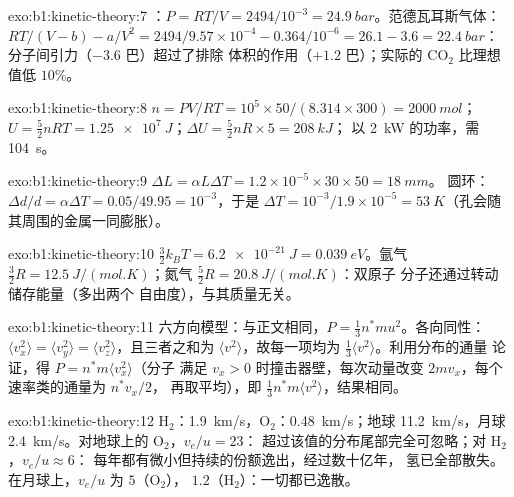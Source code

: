 \begin{solution}{exo:b1:kinetic-theory:7}
：$P = RT/V = 2494/10^{-3} = \qty{24.9}{bar}$。范德瓦耳斯气体：
$RT/(V - b) - a/V^2 = 2494/9.57\times10^{-4} - 0.364/10^{-6} = 26.1 - 3.6 =
\qty{22.4}{bar}$：分子间引力（$-3.6$ 巴）超过了排除
体积的作用（$+1.2$ 巴）；实际的 CO$_2$ 比理想值低 $10\%$。
\end{solution}

\begin{solution}{exo:b1:kinetic-theory:8}
$n = PV/RT = 10^5 \times 50/(8.314 \times 300) = \qty{2000}{mol}$；$U = \tfrac52
nRT = \qty{1.25e7}{J}$；$\Delta U = \tfrac52 nR \times 5 = \qty{208}{kJ}$；
以 \qty{2}{kW} 的功率，需 \qty{104}{s}。
\end{solution}

\begin{solution}{exo:b1:kinetic-theory:9}
$\Delta L = \alpha L\Delta T = 1.2\times10^{-5} \times 30 \times 50 = \qty{18}{mm}$。
圆环：$\Delta d/d = \alpha\Delta T = 0.05/49.95 = 10^{-3}$，于是 $\Delta T = 10^{-3}/
1.9\times10^{-5} = \qty{53}{K}$（孔会随其周围的金属一同膨胀）。
\end{solution}

\begin{solution}{exo:b1:kinetic-theory:10}
$\tfrac32 k_BT = \qty{6.2e-21}{J} = \qty{0.039}{eV}$。氩气 $\tfrac32 R =
\qty{12.5}{J/(mol.K)}$；氮气 $\tfrac52 R = \qty{20.8}{J/(mol.K)}$：双原子
分子还通过转动储存能量（多出两个
自由度），与其质量无关。
\end{solution}

\begin{solution}{exo:b1:kinetic-theory:11}
六方向模型：与正文相同，$P = \tfrac13 n^*mu^2$。各向同性：
$\langle v_x^2\rangle = \langle v_y^2\rangle = \langle v_z^2\rangle$，且三者之和为
$\langle v^2\rangle$，故每一项均为 $\tfrac13\langle v^2\rangle$。利用分布的通量
论证，得 $P = n^*m\langle v_x^2\rangle$（分子
满足 $v_x > 0$ 时撞击器壁，每次动量改变 $2mv_x$，每个速率类的通量为 $n^*v_x/2$，
再取平均），即 $\tfrac13 n^*m\langle v^2\rangle$，结果相同。
\end{solution}

\begin{solution}{exo:b1:kinetic-theory:12}
H$_2$：\qty{1.9}{km/s}，O$_2$：\qty{0.48}{km/s}；地球 \qty{11.2}{km/s}，月球
\qty{2.4}{km/s}。对地球上的 O$_2$，$v_e/u = 23$：
超过该值的分布尾部完全可忽略；对 H$_2$，$v_e/u \approx 6$：
每年都有微小但持续的份额逸出，经过数十亿年，
氢已全部散失。在月球上，$v_e/u$ 为 $5$（O$_2$），
$1.2$（H$_2$）：一切都已逸散。
\end{solution}

